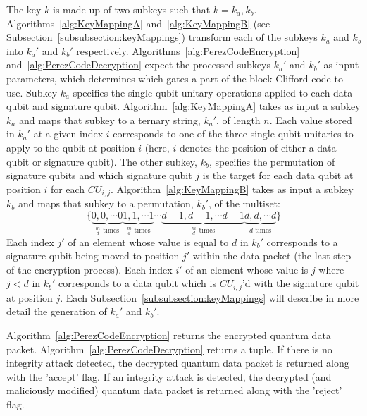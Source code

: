 The key $k$ is made up of two subkeys such that $k = k_a, k_b$. Algorithms~\ref{alg:KeyMappingA} and~\ref{alg:KeyMappingB} (see Subsection~\ref{subsubsection:keyMappings}) transform each of the subkeys $k_a$ and $k_b$ into $k_a'$ and $k_b'$ respectively. Algorithms~\ref{alg:PerezCodeEncryption} and~\ref{alg:PerezCodeDecryption} expect the processed subkeys $k_a'$ and $k_b'$ as input parameters, which determines which gates a part of the block Clifford code to use. Subkey $k_a$ specifies the single-qubit unitary operations applied to each data qubit and signature qubit. Algorithm~\ref{alg:KeyMappingA} takes as input a subkey $k_a$ and maps that subkey to a ternary string, $k_a'$, of length $n$. Each value stored in $k_a'$ at a given index $i$ corresponds to one of the three single-qubit unitaries to apply to the qubit at position $i$ (here, $i$ denotes the position of either a data qubit or signature qubit). The other subkey, $k_b$, specifies the permutation of signature qubits and which signature qubit $j$ is the target for each data qubit at position $i$ for each $\mathit{CU}_{i,j}$. Algorithm~\ref{alg:KeyMappingB} takes as input a subkey $k_b$ and maps that subkey to a permutation, $k_b'$, of the multiset:
\begin{equation}
    \{\underbrace{0, 0, \cdots 0}_{\frac{m}{d} \text{ times}}\underbrace{1, 1, \cdots 1}_{\frac{m}{d} \text{ times}}\cdots\underbrace{d-1, d-1, \cdots d-1}_{\frac{m}{d} \text{ times}}\underbrace{d, d, \cdots d}_{d \text{ times}}\}
\end{equation}
Each index $j'$ of an element whose value is equal to $d$ in $k_b'$ corresponds to a signature qubit being moved to position $j'$ within the data packet (the last step of the encryption process). Each index $i'$ of an element whose value is $j$ where $j < d$ in $k_b'$ corresponds to a data qubit which is $\mathit{CU}_{i,j}$'d with the signature qubit at position $j$. Each
Subsection~\ref{subsubsection:keyMappings} will describe in more detail the generation of $k_a'$ and $k_b'$.

Algorithm~\ref{alg:PerezCodeEncryption} returns the encrypted quantum data packet. Algorithm~\ref{alg:PerezCodeDecryption} returns a tuple. If there is no integrity attack detected, the decrypted quantum data packet is returned along with the 'accept' flag. If an integrity attack is detected, the decrypted (and maliciously modified) quantum data packet is returned along with the 'reject' flag.

